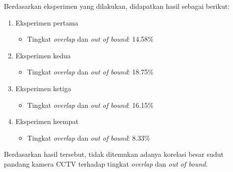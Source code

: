Berdasarkan eksperimen yang dilakukan, didapatkan hasil sebagai berikut:
\begin{enumerate}
	\item Eksperimen pertama
	\begin{itemize}
		\item Tingkat \textit{overlap} dan \textit{out of bound}: 14.58\%
	\end{itemize}
		
	\item Eksperimen kedua
	\begin{itemize}
		\item Tingkat \textit{overlap} dan \textit{out of bound}: 18.75\%
	\end{itemize}
	
	\item Eksperimen ketiga
	\begin{itemize}
		\item Tingkat \textit{overlap} dan \textit{out of bound}: 16.15\%
	\end{itemize}
	\item Eksperimen keempat
	\begin{itemize}
		\item Tingkat \textit{overlap} dan \textit{out of bound}: 8.33\%
	\end{itemize}
\end{enumerate}
Berdasarkan hasil tersebut, tidak ditemukan adanya korelasi besar sudut pandang kamera CCTV terhadap tingkat \textit{overlap} dan \textit{out of bound}.




















